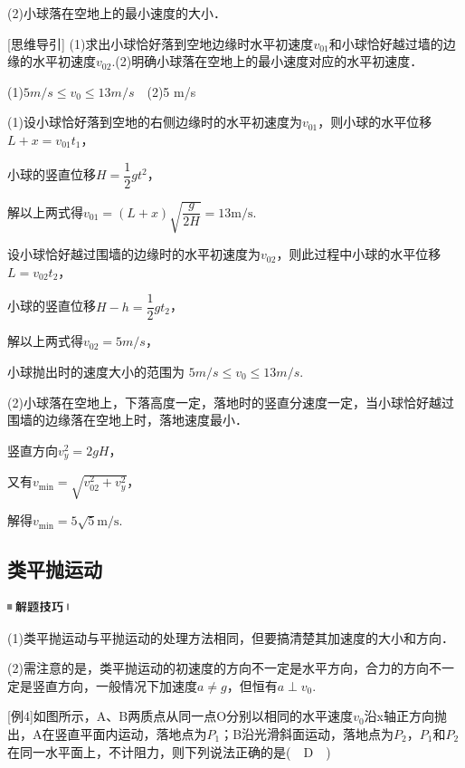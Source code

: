 \documentclass[cn,10.5pt,chinese,mac,chinesefont=founder]{elegantbook}
\begin{document}
(2)小球落在空地上的最小速度的大小．

{[}思维导引{]}
(1)求出小球恰好落到空地边缘时水平初速度$v_{01}$和小球恰好越过墙的边缘的水平初速度$v_{02}$.(2)明确小球落在空地上的最小速度对应的水平初速度．
\begin{solution}(1)$5 m/s\leq v_0\leq 13 m/s$　(2)5 m/s

	(1)设小球恰好落到空地的右侧边缘时的水平初速度为$v_{01}$，则小球的水平位移$L+x=v_{01}t_1$，

小球的竖直位移$H=\dfrac{1}{2} g t^{2}$，

解以上两式得$v_{01}=(L+x) \sqrt{\dfrac{g}{2 H}}=13 \mathrm{m} / \mathrm{s}$.

设小球恰好越过围墙的边缘时的水平初速度为$v_{02}$，则此过程中小球的水平位移$L=v_{02}t_2$，

小球的竖直位移$H-h=\dfrac{1}{2} g t_{2}$，

解以上两式得$v_{02}=5 m/s$，

小球抛出时的速度大小的范围为 $5 m/s\leq v_0\leq 13 m/s$.

(2)小球落在空地上，下落高度一定，落地时的竖直分速度一定，当小球恰好越过围墙的边缘落在空地上时，落地速度最小．

竖直方向$v_{y}^{2}=2 g H$，

又有$v_{\min }=\sqrt{v_{02}^{2}+v_{y}^{2}}$，

解得$v_{\min }=5 \sqrt{5} \mathrm{m} / \mathrm{s}$.


\end{solution}

\newpage
\subsection{类平抛运动}

\begin{center}\includegraphics[width=0.70833in,height=0.125in]{media/image37.png}\end{center}

(1)类平抛运动与平抛运动的处理方法相同，但要搞清楚其加速度的大小和方向．

(2)需注意的是，类平抛运动的初速度的方向不一定是水平方向，合力的方向不一定是竖直方向，一般情况下加速度$a\neq g$，但恒有$a\perp v_0$.

{[}例4{]}如图所示，A、B两质点从同一点O分别以相同的水平速度$v_0$沿x轴正方向抛出，A在竖直平面内运动，落地点为$P_1$；B沿光滑斜面运动，落地点为$P_2$，$P_1$和$P_2$在同一水平面上，不计阻力，则下列说法正确的是(　D　)
\end{document}
